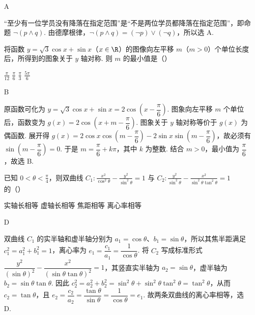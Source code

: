 \begin{answer}
A
\end{answer}

\begin{solution}
“至少有一位学员没有降落在指定范围”是“不是两位学员都降落在指定范围”，即命题 \(\neg(p\wedge q)\).
由德摩根律，\(\neg(p\wedge q)=(\neg p)\vee(\neg q)\)，所以选 A.
\end{solution}

\begin{problem}
将函数 \( y = \sqrt{3} \cos x + \sin x \)（\(x \in \R\)）的图像向左平移 \(m\)（\(m > 0\)）个单位长度后，所得到的图象关于 \(y\) 轴对称. 则 \(m\) 的最小值是（\quad）

\choices
    {\(\frac{\pi}{12}\)}
    {\(\frac{\pi}{6}\)}
    {\(\frac{\pi}{3}\)}
    {\(\frac{5\pi}{6}\)}
\end{problem}

\begin{answer}
B
\end{answer}

\begin{solution}
原函数可化为
\(y=\sqrt{3}\cos x+\sin x=2\cos\left(x-\dfrac{\pi}{6}\right)\).
图象向左平移 \(m\) 个单位后，函数变为
\(g(x)=2\cos\left(x+m-\dfrac{\pi}{6}\right)\).
图象关于 \(y\) 轴对称等价于 \(g(x)\) 为偶函数. 展开得
\(g(x)=2\cos x\cos\left(m-\dfrac{\pi}{6}\right)-2\sin x\sin\left(m-\dfrac{\pi}{6}\right)\)，故必须有
\(\sin\left(m-\dfrac{\pi}{6}\right)=0\).
于是 \(m=\dfrac{\pi}{6}+k\pi\)，其中 \(k\) 为整数. 结合 \(m>0\)，最小值为 \(\dfrac{\pi}{6}\)，故选 B.
\end{solution}

\begin{problem}
已知 \(0 < \theta < \frac{\pi}{4}\)，则双曲线 \(C_1: \frac{x^{2}}{\cos^{2}\theta} - \frac{y^{2}}{\sin^{2}\theta} = 1\) 与 \(C_2: \frac{y^{2}}{\sin^{2}\theta} - \frac{x^{2}}{\sin^{2}\theta \tan^{2}\theta} = 1\) 的（\quad）

\choices
    {实轴长相等}
    {虚轴长相等}
    {焦距相等}
    {离心率相等}
\end{problem}

\begin{answer}
D
\end{answer}

\begin{solution}
双曲线 \(C_1\) 的实半轴和虚半轴分别为 \(a_1=\cos\theta\)、\(b_1=\sin\theta\)，所以其焦半距满足 \(c_1^2=a_1^2+b_1^2=1\)，离心率为
\(e_1=\dfrac{c_1}{a_1}=\dfrac{1}{\cos\theta}\).
将 \(C_2\) 写成标准形式
\(\dfrac{y^2}{(\sin\theta)^2}-\dfrac{x^2}{(\sin\theta\tan\theta)^2}=1\)，其竖直实半轴为 \(a_2=\sin\theta\)，虚半轴为 \(b_2=\sin\theta\tan\theta\).
因此
\(c_2^2=a_2^2+b_2^2=\sin^2\theta+\sin^2\theta\tan^2\theta=\tan^2\theta\)，从而 \(c_2=\tan\theta\)，且
\(e_2=\dfrac{c_2}{a_2}=\dfrac{\tan\theta}{\sin\theta}=\dfrac{1}{\cos\theta}=e_1\).
故两条双曲线的离心率相等，选 D.
\end{solution}

